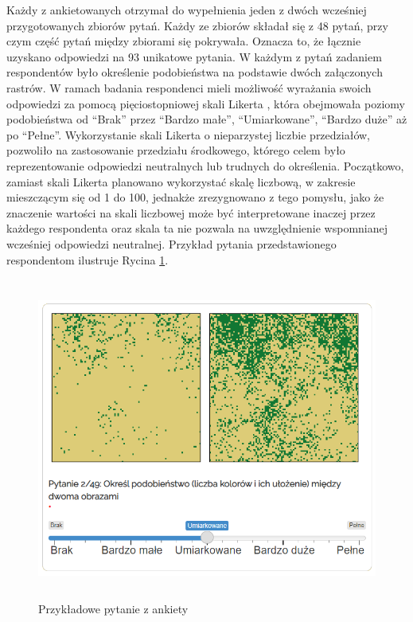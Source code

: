 \documentclass{amuthesis}
\begin{document}
Każdy z ankietowanych otrzymał do wypełnienia jeden z dwóch wcześniej
przygotowanych zbiorów pytań. Każdy ze zbiorów składał się z 48 pytań,
przy czym część pytań między zbiorami się pokrywała. Oznacza to, że
łącznie uzyskano odpowiedzi na 93 unikatowe pytania. W każdym z pytań
zadaniem respondentów było określenie podobieństwa na podstawie dwóch
załączonych rastrów. W ramach badania respondenci mieli możliwość
wyrażania swoich odpowiedzi za pomocą pięciostopniowej skali Likerta
\autocite{likert_scale}, która obejmowała poziomy podobieństwa od
``Brak'' przez ``Bardzo małe'', ``Umiarkowane'', ``Bardzo duże'' aż po
``Pełne''. Wykorzystanie skali Likerta o nieparzystej liczbie
przedziałów, pozwoliło na zastosowanie przedziału środkowego, którego
celem było reprezentowanie odpowiedzi neutralnych lub trudnych do
określenia. Początkowo, zamiast skali Likerta planowano wykorzystać
skalę liczbową, w zakresie mieszczącym się od 1 do 100, jednakże
zrezygnowano z tego pomysłu, jako że znaczenie wartości na skali
liczbowej może być interpretowane inaczej przez każdego respondenta oraz
skala ta nie pozwala na uwzględnienie wspomnianej wcześniej odpowiedzi
neutralnej. Przykład pytania przedstawionego respondentom ilustruje
Rycina \ref{fig-przyklad_pytania}.

\begin{figure}[t]

{\centering \includegraphics[width=5.10417in,height=4.16667in]{figures/przyklad_pytania.png}

}

\caption{\label{fig-przyklad_pytania}Przykładowe pytanie z ankiety}

\end{figure}
\end{document}
